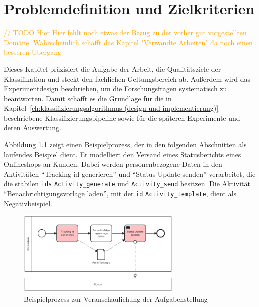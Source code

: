 \chapter{Problemdefinition und Zielkriterien}\label{ch:problemdefinition-und-zielkriterien}

\textcolor{orange}{// TODO Hier Hier fehlt noch etwas der Bezug zu der vorher gut vorgestellten Domäne. Wahrscheinlich schafft das Kapitel "Verwandte Arbeiten" da noch einen besseren Übergang}

Dieses Kapitel präzisiert die Aufgabe der Arbeit, die Qualitätsziele der Klassifikation und steckt den fachlichen Geltungsbereich ab. Außerdem wird das Experimentdesign beschrieben, um die Forschungsfragen systematisch zu beantworten. Damit schafft es die Grundlage für die in Kapitel~\ref{ch:klassifizierungsalgorithmus-(design-und-implementierung)} beschriebene Klassifizierungspipeline sowie für die späteren Experimente und deren Auswertung.

Abbildung \ref{fig:running_example} zeigt einen Beispielprozess, der in den folgenden Abschnitten als laufendes Beispiel dient. Er modelliert den Versand eines Statusberichts eines Onlineshops an Kunden. Dabei werden personenbezogene Daten in den Aktivitäten \enquote{Tracking-id generieren} und \enquote{Status Update senden} verarbeitet, die die stabilen \texttt{ids} \texttt{Activity\_generate} und \texttt{Activity\_send} besitzen. Die Aktivität \enquote{Benachrichtigungsvorlage laden}, mit der \texttt{id} \texttt{Activity\_template}, dient als Negativbeispiel.

\begin{figure}[h]
    \centering
    \includegraphics[width=0.7\textwidth]{images/running_example}
    \caption{Beispielprozess zur Veranschaulichung der Aufgabenstellung}
    \label{fig:running_example}
\end{figure}





